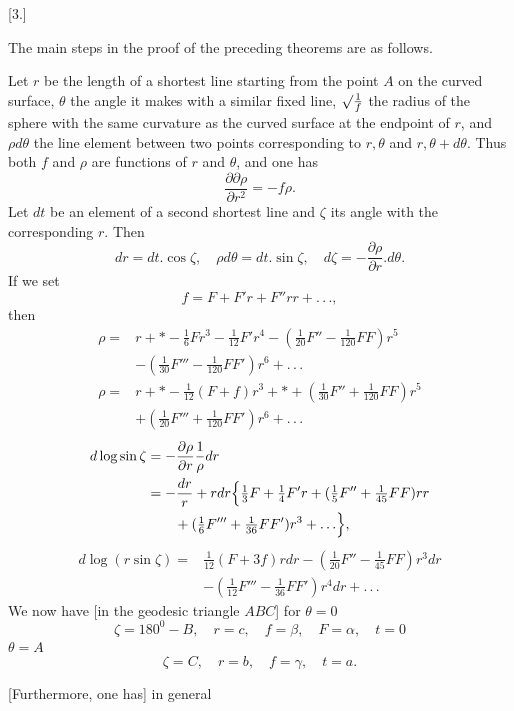 \par{}\begin{center}[3.]\end{center}
\noindent\hspace*{1.2em}The main steps in the proof of the preceding theorems are as follows.

Let $r$ be the length of a shortest line starting from the point $A$ on the curved surface, $\theta$ the angle it makes with a similar fixed line, $\mathord{\surd}\frac1f$ the radius of the sphere with the same curvature as the curved surface at the endpoint of $r$, and $\rho d\theta$ the line element between two points corresponding to $r,\theta$ and $r,\theta+d\theta$. Thus both $f$ and $\rho$ are functions of $r$ and $\theta$, and one has
\[
\frac{\partial\partial\rho}{\partial r^2}=-f\rho.
\]
\indent Let $dt$ be an element of a second shortest line and $\zeta$ its angle with the corresponding $r$. Then
\[
dr=dt.\cos\zeta,\quad\rho d\theta=dt.\sin\zeta,\quad d\zeta=-\frac{\partial\rho}{\partial r}.d\theta.
\]
\noindent If we set
\[
f=F+F'r+F''rr+.\, .\, .,
\]
\noindent then
\[
\begin{aligned}
\rho={}&r+*-\tfrac16Fr^3-\tfrac1{12}F'r^4-(\tfrac1{20}F''-\tfrac1{120}FF)r^5\\
&-(\tfrac1{30}F'''-\tfrac1{120}FF')r^6+.\, .\, .\\
\rho={}&r+*-\tfrac1{12}(F+f)r^3+*+(\tfrac1{30}F''+\tfrac1{120}FF)r^5\\
&+(\tfrac1{20}F'''+\tfrac1{120}FF')r^6+.\, .\, .
\end{aligned}
\]
\[
\begin{aligned}
d\log\sin\zeta&=-\frac{\partial\rho}{\partial r}\frac1\rho dr\\
&=-\frac{dr}r+rdr\Bigl\{\tfrac13F+\tfrac14F'r+(\tfrac15F''+\tfrac1{45}FF)rr\\
&\qquad+(\tfrac16F'''+\tfrac1{36}FF')r^3+.\, .\, .\Bigr\},
\end{aligned}
\]
\[
\begin{aligned}
d\log(r\sin\zeta)={}&\tfrac1{12}(F+3f)rdr-(\tfrac1{20}F''-\tfrac1{45}FF)r^3dr\\
&-(\tfrac1{12}F'''-\tfrac1{36}FF')r^4dr+.\, .\, .
\end{aligned}
\]
\indent We now have [in the geodesic triangle $ABC$] for $\theta=0$
\[
\zeta=180^0-B,\quad r=c,\quad f=\beta,\quad F=\alpha,\quad t=0
\]
 $\theta=A$
\[
\zeta=C,\quad r=b,\quad f=\gamma,\quad t=a.
\]
\begin{center}\end{center}
\noindent\hspace*{1.2em}[Furthermore, one has] in general
